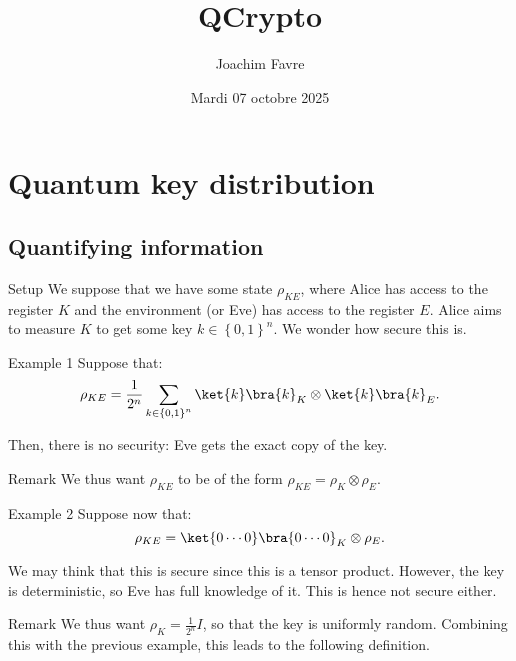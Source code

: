 \documentclass[a4paper]{article}
\title{QCrypto}
\author{Joachim Favre}
\date{Mardi 07 octobre 2025}
\begin{document}
\maketitle


\section{Quantum key distribution}

\subsection{Quantifying information}

\begin{parag}{Setup}
    We suppose that we have some state $\rho_{KE}$, where Alice has access to the register $K$ and the environment (or Eve) has access to the register $E$. Alice aims to measure $K$ to get some key $k \in \left\{0, 1\right\}^n$. We wonder how secure this is.
\end{parag}

\begin{parag}{Example 1}
    Suppose that: 
    \[\rho_{KE} = \frac{1}{2^n} \sum_{k \in \left\{0, 1\right\}^n} \ket{k}\bra{k}_K \otimes \ket{k}\bra{k}_E.\]
    
    Then, there is no security: Eve gets the exact copy of the key.

    \begin{subparag}{Remark}
        We thus want $\rho_{KE}$ to be of the form $\rho_{KE} = \rho_K \otimes \rho_E$.
    \end{subparag}
\end{parag}

\begin{parag}{Example 2}
    Suppose now that: 
    \[\rho_{KE} = \ket{0\cdots0}\bra{0\cdots0}_K \otimes \rho_E.\]
    
    We may think that this is secure since this is a tensor product. However, the key is deterministic, so Eve has full knowledge of it. This is hence not secure either.

    \begin{subparag}{Remark}
        We thus want $\rho_K = \frac{1}{2^n} I$, so that the key is uniformly random. Combining this with the previous example, this leads to the following definition.
    \end{subparag}
\end{parag}
\end{document}
